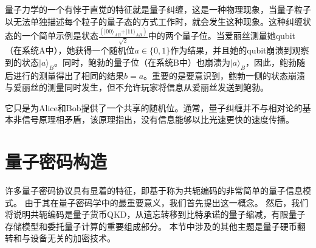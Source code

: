 

量子力学的一个有悖于直觉的特征就是量子纠缠，这是一种物理现象，当量子粒子以无法单独描述每个粒子的量子态的方式工作时，就会发生这种现象。这种纠缠状态的一个简单示例是状态$\frac{(\vert 00\rangle_{AB} +\vert 11\rangle_{AB})}{\sqrt{2}}$中的两个量子位。当爱丽丝测量她qubit（在系统A中），她获得一个随机位$a \in \{0, 1\}$作为结果，并且她的qubit崩溃到观察到的状态$\vert a\rangle_B$。同时，鲍勃的量子位（在系统B中）也崩溃为$\vert a\rangle_B$，因此，鲍勃随后进行的测量得出了相同的结果$b = a$。重要的是要意识到，鲍勃一侧的状态崩溃与爱丽丝的测量同时发生，但不允许玩家将信息从爱丽丝发送到鲍勃。

它只是为Alice和Bob提供了一个共享的随机位。通常，量子纠缠并不与相对论的基本非信号原理相矛盾，该原理指出，没有信息能够以比光速更快的速度传播。

\section{量子密码构造}
许多量子密码协议具有显着的特征，即基于称为共轭编码的非常简单的量子信息模式。 由于其在量子密码学中的最重要意义，我们首先提出这一概念。 然后，我们将说明共轭编码是量子货币QKD，从遗忘转移到比特承诺的量子缩减，有限量子存储模型和委托量子计算的重要组成部分。 本节中涉及的其他主题是量子硬币翻转和与设备无关的加密技术。


